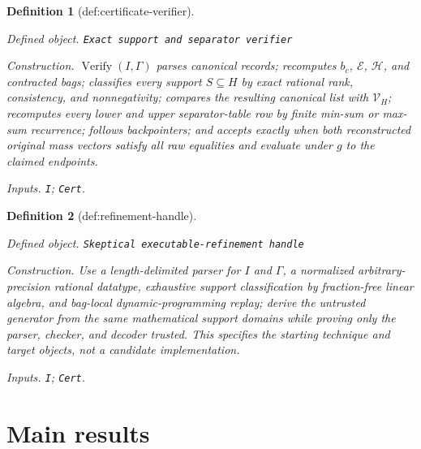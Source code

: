 \documentclass{article}
\newtheorem{definition}{Definition}
\begin{document}
\begin{definition}[def:certificate-verifier]\label{def:certificate-verifier}
\par\smallskip\noindent\emph{Defined object.} \texttt{Exact support and separator verifier}
\par\smallskip\noindent\emph{Construction.} \(\operatorname{Verify}(I,\Gamma)\) parses canonical records; recomputes \(b_c\), \(\mathcal E\), \(\mathcal H\), and contracted bags; classifies every support \(S\subseteq H\) by exact rational rank, consistency, and nonnegativity; compares the resulting canonical list with \(\mathcal V_H\); recomputes every lower and upper separator-table row by finite min-sum or max-sum recurrence; follows backpointers; and accepts exactly when both reconstructed original mass vectors satisfy all raw equalities and evaluate under \(g\) to the claimed endpoints.
\par\smallskip\noindent\emph{Inputs.} \texttt{I}; \texttt{Cert}.
\end{definition}

\begin{definition}[def:refinement-handle]\label{def:refinement-handle}
\par\smallskip\noindent\emph{Defined object.} \texttt{Skeptical executable-\allowbreak{}refinement handle}
\par\smallskip\noindent\emph{Construction.} Use a length-delimited parser for \(I\) and \(\Gamma\), a normalized arbitrary-precision rational datatype, exhaustive support classification by fraction-free linear algebra, and bag-local dynamic-programming replay; derive the untrusted generator from the same mathematical support domains while proving only the parser, checker, and decoder trusted. This specifies the starting technique and target objects, not a candidate implementation.
\par\smallskip\noindent\emph{Inputs.} \texttt{I}; \texttt{Cert}.
\end{definition}

\section{Main results}
\end{document}
